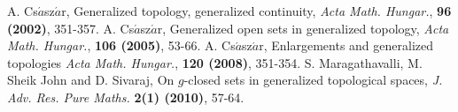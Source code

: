 \documentclass{matua}
\begin{document}
\begin{thebibliography}{99}
 A. Cs$\acute{a}$sz$\acute{a}$r, Generalized topology, generalized continuity, \emph{Acta Math. Hungar.}, \textbf{96 (2002)}, 351-357.
 A. Cs$\acute{a}$sz$\acute{a}$r, Generalized open sets in generalized topology, \emph{Acta Math. Hungar.}, \textbf{106 (2005)}, 53-66.
 A. Cs$\acute{a}$sz$\acute{a}$r, Enlargements and generalized topologies \emph{Acta Math. Hungar.}, \textbf{120 (2008)}, 351-354.
 S. Maragathavalli, M. Sheik John and D. Sivaraj, On $g$-closed sets in generalized topological spaces, \emph{J. Adv. Res. Pure Maths.} \textbf{2(1) (2010)}, 57-64.
\end{thebibliography}
\end{document}
